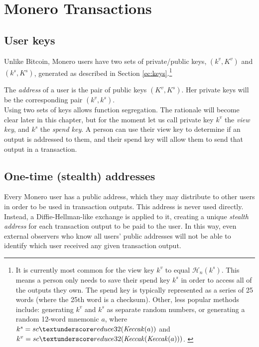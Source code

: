 

\chapter{Monero Transactions}
\label{chapter:transactions}

\section{User keys}

Unlike Bitcoin, Monero users have two sets of private/public keys, \((k^v, K^v)\) and \( (k^s, K^s) \), generated as described in Section \ref{ec:keys}.\footnote{It is currently most common for the view key $k^v$ to equal $\mathcal{H}_n(k^s)$. This means a person only needs to save their spend key $k^s$ in order to access all of the outputs they own. The spend key is typically represented as a series of 25 words (where the 25th word is a checksum). Other, less popular methods include: generating $k^v$ and $k^s$ as separate random numbers, or generating a random 12-word mnemonic $a$, where $k^s = sc\textunderscore reduce32(\mathit{Keccak}(a))$ and $k^v = sc\textunderscore reduce32(\mathit{Keccak}(\mathit{Keccak}(a)))$. \cite{luigi-address}}

The {\em address} of a user is the pair of public keys \((K^v, K^s)\). Her private keys will be the corresponding pair \( (k^v, k^s) \).
\\

Using two sets of keys allows function segregation. The rationale will become clear later in this chapter, but for the moment let us call private key $k^v$ the {\em view key}, and $k^s$ the {\em spend key}. A person can use their view key to determine if an output is addressed to them, and their spend key will allow them to send that output in a transaction.



\section{One-time (stealth) addresses}
\label{sec:one-time-addresses}

Every Monero user has a public address, which they may distribute to other users in order to be used in transaction outputs. This address is never used directly. Instead, a Diffie-Hellman-like exchange is applied to it, creating a unique {\em stealth address} for each transaction output to be paid to the user. In this way, even external observers who know all users’ public addresses will not be able to identify which user received any given transaction output.
\\

